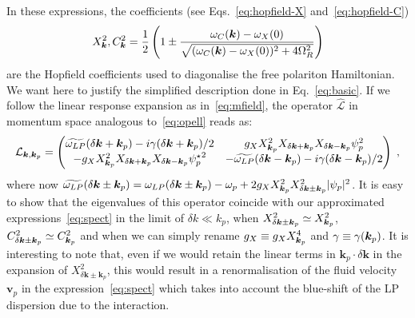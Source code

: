 \begin{subappendices}
In these expressions, the coefficients (see Eqs.~\eqref{eq:hopfield-X}
and~\eqref{eq:hopfield-C}) 
%
\begin{equation}
  X^2_{\bm{k}}, C^2_{\bm{k}} = \frac{1}{2} \left(1 \pm \frac{\omega_C(\bm{k}) -
    \omega_X(0)}{\sqrt{(\omega_C(\bm{k}) - \omega_X(0))^2 +
      4\Omega_R^2}}\right)
\end{equation}
%
are the Hopfield coefficients used to diagonalise the free polariton
Hamiltonian. We want here to justify the simplified description done
in Eq.~\eqref{eq:basic}. If we follow the linear response expansion as
in~\eqref{eq:mfield}, the operator $\hat{\mathcal{L}}$ in momentum
space analogous to~\eqref{eq:opell} reads as:
%
\begin{equation}
  \mathcal{L}_{\bm{k},\bm{k}_p} = \begin{pmatrix}
    \widetilde{\omega_{LP}} (\delta \bm{k}+\bm{k}_p) - i
    \gamma(\delta \bm{k}+\bm{k}_p)/2 & g_X X_{\bm{k}_p}^2 X_{\delta
      \bm{k}+\bm{k}_p} X_{\delta \bm{k}-\bm{k}_p} \psi_p^2
    \\ - g_X X_{\bm{k}_p}^2 X_{\delta \bm{k}+\bm{k}_p} X_{\delta
      \bm{k}-\bm{k}_p}{\psi_p^{\star}}^2 & -
    \widetilde{\omega_{LP}}(\delta \bm{k}-\bm{k}_p) -
    i\gamma(\delta \bm{k}-\bm{k}_p)/2 \end{pmatrix}\; ,
\label{eq:opel2}
\end{equation}
%
where now $\widetilde{\omega_{LP}} (\delta \bm{k} \pm\bm{k}_p) =
\omega_{LP} (\delta \bm{k} \pm\bm{k}_p) -\omega_p + 2 g_X X_{\bm{k}_p}^2
X_{\delta \bm{k} \pm \bm{k}_p}^2 |\psi_p|^2$. It is easy to show that
the eigenvalues of this operator coincide with our approximated
expressions~\eqref{eq:spect} in the limit of $\delta k \ll k_p$,
when $X_{\delta \bm{k} \pm \bm{k}_p}^2 \simeq X_{\bm{k}_p}^2$, $C_{\delta
\bm{k} \pm \bm{k}_p}^2 \simeq C_{\bm{k}_p}^2$ and when we can simply
rename $g_X \equiv g_X X_{\bm{k}_p}^4$ and $\gamma \equiv
\gamma(\bm{k}_p)$. It is interesting to note that, even if we would
retain the linear terms in $\bm{k}_p \cdot \delta \bm{k}$ in the
expansion of $X_{\delta \bm{k} \pm \bm{k}_p}^2$, this would result in
a renormalisation of the fluid velocity $\bm{v}_p$ in the
expression~\eqref{eq:spect} which takes into account the blue-shift of
the LP dispersion due to the interaction.
\end{subappendices}



